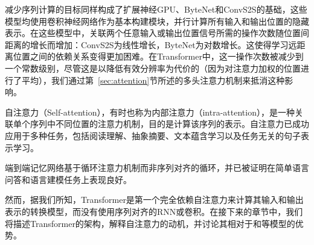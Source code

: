 减少序列计算的目标同样构成了扩展神经GPU\citep{extendedngpu}、ByteNet\citep{NalBytenet2017}和ConvS2S\citep{JonasFaceNet2017}的基础，这些模型均使用卷积神经网络作为基本构建模块，并行计算所有输入和输出位置的隐藏表示。在这些模型中，关联两个任意输入或输出位置信号所需的操作次数随位置间距离的增长而增加：ConvS2S为线性增长，ByteNet为对数增长。这使得学习远距离位置之间的依赖关系变得更加困难\citep{hochreiter2001gradient}。在Transformer中，这一操作次数被减少到一个常数级别，尽管这是以降低有效分辨率为代价的（因为对注意力加权的位置进行了平均），我们通过第~\ref{sec:attention}节所述的多头注意力机制来抵消这种影响。

自注意力（Self-attention），有时也称为内部注意力（intra-attention），是一种关联单个序列中不同位置的注意力机制，目的是计算该序列的表示。自注意力已成功应用于多种任务，包括阅读理解、抽象摘要、文本蕴含学习以及任务无关的句子表示学习\citep{cheng2016long, decomposableAttnModel, paulus2017deep, lin2017structured}。

端到端记忆网络基于循环注意力机制而非序列对齐的循环，并已被证明在简单语言问答和语言建模任务上表现良好\citep{sukhbaatar2015}。

然而，据我们所知，Transformer是第一个完全依赖自注意力来计算其输入和输出表示的转换模型，而没有使用序列对齐的RNN或卷积。在接下来的章节中，我们将描述Transformer的架构，解释自注意力的动机，并讨论其相对于\citep{neural_gpu, NalBytenet2017}和\citep{JonasFaceNet2017}等模型的优势。






